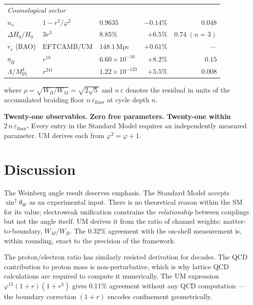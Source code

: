 \documentclass[12pt]{article}
\begin{document}
\begin{center}
\begin{tabular}{lllrr}
\midrule
\multicolumn{5}{l}{\textit{Cosmological sector}} \\
$n_s$              & $1-r^2/\varphi^2$ & $0.9635$ & $-0.14\%$ & $0.048$ \\
$\Delta H_0/H_0$   & $3r^3$ & $8.85\%$ & $+6.5\%$ & $0.74\;(n{=}3)$ \\
$r_s$ (BAO)        & EFTCAMB/UM & $148.1\,\text{Mpc}$ & $+0.61\%$ & --- \\
$\eta_B$           & $r^{18}$ & $6.60\!\times\!10^{-10}$ & $+8.2\%$ & $0.15$ \\
$\Lambda/M_{\text{Pl}}^4$ & $r^{241}$ & $1.22\!\times\!10^{-123}$ & $+5.5\%$ & $0.008$ \\
\bottomrule
\end{tabular}
\end{center}

where $\rho = \sqrt{W_B/W_M} = \sqrt{2\sqrt{5}}$ and $n\,\varepsilon$
denotes the residual in units of the accumulated braiding floor
$n\,\varepsilon_{\text{floor}}$ at cycle depth $n$.

\textbf{Twenty-one observables. Zero free parameters. Twenty-one within
$2\,n\,\varepsilon_{\text{floor}}$.} Every entry in the Standard Model
requires an independently measured parameter. UM derives each from
$\varphi^2 = \varphi + 1$.

\section{Discussion}

The Weinberg angle result deserves emphasis. The Standard Model
accepts $\sin^2\!\theta_W$ as an experimental input. There is no
theoretical reason within the SM for its value; electroweak
unification constrains the \emph{relationship} between couplings
but not the angle itself. UM derives it from the ratio of channel
weights: matter-to-boundary, $W_M/W_B$. The 0.32\% agreement with
the on-shell measurement is, within rounding, exact to the precision
of the framework.

The proton/electron ratio has similarly resisted derivation for
decades. The QCD contribution to proton mass is non-perturbative,
which is why lattice QCD calculations are required to compute it
numerically. The UM expression $\varphi^{15}(1+r)(1+r^3)$ gives
0.11\% agreement without any QCD computation — the boundary
correction $(1+r)$ encodes confinement geometrically.
\end{document}
